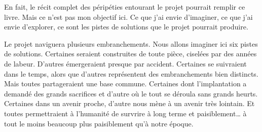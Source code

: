 En fait, le récit complet des péripéties entourant le projet \nomProjet{} pourrait
remplir ce livre. Mais ce n'est pas mon objectif ici. 
Ce que j'ai envie d'imaginer, ce que j'ai envie d'explorer, ce sont les pistes de solutions
que le projet pourrait produire.


Le projet \nomProjet{} naviguera plusieurs embranchements.  Nous allons
imaginer ici six pistes de solutions.  Certaines seraient construites de toute
pièce, ciselées par des années de labeur.  D'autres émergeraient presque par
accident.  Certaines se suivraient dans le temps, alors que d'autres
représentent des embranchements bien distincts. Mais toutes partageraient une
base commune.  
Certaines dont l'implantation a demandé des grands sacrifices et d'autre où le tout se déroula
sans grands heurts. 
Certaines dans un avenir proche, d'autre nous mène à un avenir très lointain.
Et toutes permettraient à l'humanité de survrire à long terme et
paisiblement\ldots{} à tout le moins beaucoup plus paisiblement qu'à notre
époque.
